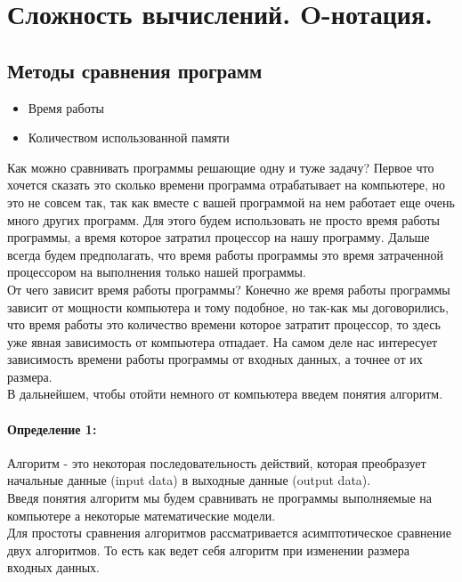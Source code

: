 \section{Сложность вычислений. O-нотация.}

\subsection{Методы сравнения программ}

\begin{itemize}
	\item Время работы
	\item Количеством использованной памяти
\end{itemize}

Как можно сравнивать программы решающие одну и туже задачу? Первое что хочется сказать это сколько времени программа отрабатывает на компьютере, но это не совсем так, так как вместе с вашей программой на нем работает еще очень много других программ. Для этого будем использовать не просто время работы программы, а время которое затратил процессор на нашу программу. Дальше всегда будем предполагать, что время работы программы это время затраченной процессором на выполнения только нашей программы.\\

От чего зависит время работы программы? Конечно же время работы программы зависит от мощности компьютера и тому подобное, но так-как мы договорились, что время работы это количество времени которое затратит процессор, то здесь уже явная зависимость от компьютера отпадает. На самом деле нас интересует зависимость времени работы программы от входных данных, а точнее от их размера.\\

В дальнейшем, чтобы отойти немного от компьютера введем понятия алгоритм.

\paragraph{Определение 1:} Алгоритм - это некоторая последовательность действий, которая преобразует начальные данные (input data) в выходные данные (output data).\\

Введя понятия алгоритм мы будем сравнивать не программы выполняемые на компьютере а некоторые математические модели.\\

Для простоты сравнения алгоритмов рассматривается асимптотическое сравнение двух алгоритмов. То есть как ведет себя алгоритм при изменении размера входных данных.

